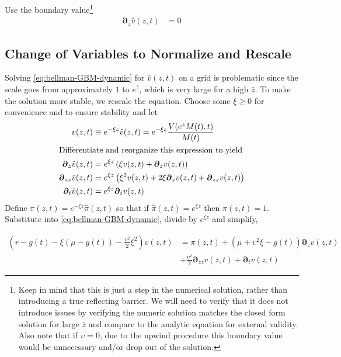 \documentclass[11pt]{article}
\newcommand{\D}[1][]{\ensuremath{\boldsymbol{\partial}_{#1}}}
\begin{document}
Use the boundary value\footnote{Keep in mind that this is just a step in the numerical solution, rather than introducing a true reflecting barrier.  We will need to verify that it does not introduce issues by verifying the numeric solution matches the closed form solution for large $\bar{z}$ and compare to the analytic equation for external validity.  Also note that if $\upsilon = 0$, due to the upwind procedure this boundary value would be unnecessary and/or drop out of the solution.}
	\begin{align}
	\D[z]\hat{v}(\bar{z},t) &= 0\label{eq:reflecting-GBM-dynamic}
	\end{align}


\subsection{Change of Variables to Normalize and Rescale}\label{eq:simple-rescale}
Solving \cref{eq:bellman-GBM-dynamic} for $\hat{v}(z,t)$ on a grid is problematic since the scale goes from approximately $1$ to $e^{\bar{z}}$, which is very large for a high $\bar{z}$.  To make the solution more stable, we rescale the equation.  Choose some $\xi \geq 0$ for convenience and to ensure stability and let
\begin{align}
	v(z,t) &\equiv e^{-\xi z}\hat{v}(z,t) = e^{-\xi z}\frac{V(e^z M(t),t)}{M(t)}\\
	\intertext{Differentiate and reorganize this expression to yield}
	\D[z]\hat{v}(z,t) &= e^{\xi z}\left(\xi v(z,t) + \D[z]v(z,t) \right)\\
	\D[zz]\hat{v}(z,t) &= e^{\xi z}\left(\xi^{2} v(z,t) + 2 \xi\D[z]v(z,t) + \D[zz]v(z,t)  \right)\\
	\D[t]\hat{v}(z,t) &= e^{\xi z} \D[t]v(z,t)
\end{align}
Define $\pi(z,t) = e^{-\xi z}\hat{\pi}(z,t)$ so that if $\hat{\pi}(z,t) = e^{\xi z}$ then $\pi(z,t) = 1$.  Substitute into \cref{eq:bellman-GBM-dynamic}, divide by $e^{\xi z}$ and simplify,

\begin{align}
	\left(r - g(t)- \xi(\mu-g(t)) - \frac{\upsilon^2}{2}\xi^2\right)  v(z,t) &= \pi(z,t) + (\mu+ \upsilon^2\xi - g(t)) \D[z]v(z,t) \nonumber \\ &+ \frac{\upsilon^2}{2} \D[zz]v(z,t) + \D[t]v(z,t)  \label{eq:bellman-GBM-dynamic-normalized}
\end{align}
\end{document}
